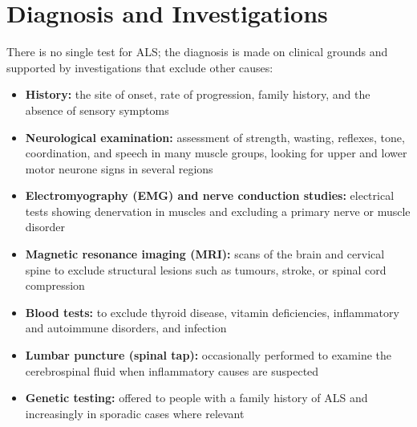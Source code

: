 \section*{Diagnosis and Investigations}
There is no single test for ALS; the diagnosis is made on clinical grounds and supported by investigations that exclude other causes:
\begin{itemize}
    \item \textbf{History:} the site of onset, rate of progression, family history, and the absence of sensory symptoms
    \item \textbf{Neurological examination:} assessment of strength, wasting, reflexes, tone, coordination, and speech in many muscle groups, looking for upper and lower motor neurone signs in several regions
    \item \textbf{Electromyography (EMG) and nerve conduction studies:} electrical tests showing denervation in muscles and excluding a primary nerve or muscle disorder
    \item \textbf{Magnetic resonance imaging (MRI):} scans of the brain and cervical spine to exclude structural lesions such as tumours, stroke, or spinal cord compression
    \item \textbf{Blood tests:} to exclude thyroid disease, vitamin deficiencies, inflammatory and autoimmune disorders, and infection
    \item \textbf{Lumbar puncture (spinal tap):} occasionally performed to examine the cerebrospinal fluid when inflammatory causes are suspected
    \item \textbf{Genetic testing:} offered to people with a family history of ALS and increasingly in sporadic cases where relevant
\end{itemize}

